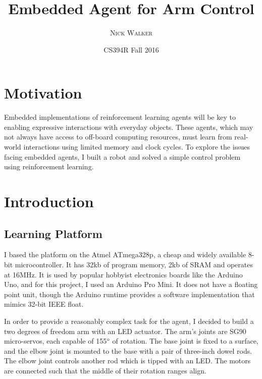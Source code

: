 \documentclass{article}
\title{Embedded Agent for Arm Control} %
\author{\textsc{Nick Walker}} %
\date{CS394R Fall 2016} %
\begin{document}
	
\maketitle %



\section{Motivation}

Embedded implementations of reinforcement learning agents will be key to enabling expressive interactions with everyday objects. These agents, which may not always have access to off-board computing resources, must learn from real-world interactions using limited memory and clock cycles. To explore the issues facing embedded agents, I built a robot and solved a simple control problem using reinforcement learning.



\section{Introduction}

\subsection{Learning Platform}

I based the platform on the Atmel ATmega328p, a cheap and widely available 8-bit microcontroller. It has 32kb of program memory, 2kb of SRAM and operates at 16MHz. It is used by popular hobbyist electronics boards like the Arduino Uno, and for this project, I used an Arduino Pro Mini. It does not have a floating point unit, though the Arduino runtime provides a software implementation that mimics 32-bit IEEE float.

In order to provide a reasonably complex task for the agent, I decided to build a two degrees of freedom arm with an LED actuator. The arm's joints are SG90 micro-servos, each capable of 155$\degree$ of rotation. The base joint is fixed to a surface, and the elbow joint is mounted to the base with a pair of three-inch dowel rods. The elbow joint controls another rod which is tipped with an LED. The motors are connected such that the middle of their rotation ranges align.
\end{document}
